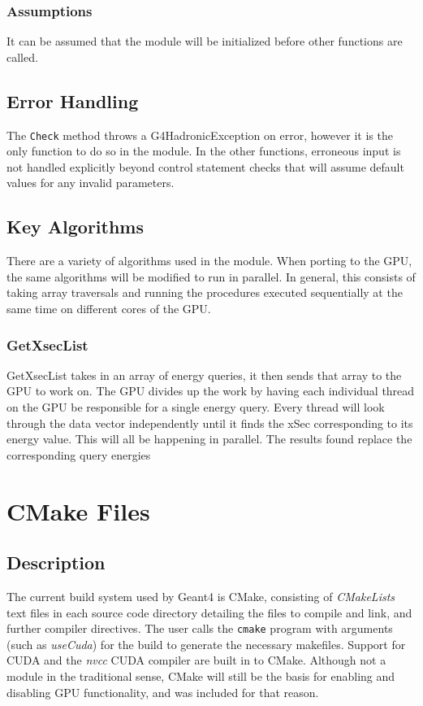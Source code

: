 \documentclass[12pt]{article}
\begin{document}
\subsubsection{Assumptions}%
It can be assumed that the module will be initialized before other functions are called.

\subsection{Error Handling}
The \texttt{Check} method throws a G4HadronicException on error, however it is the only function to do so in the module. In the other functions, erroneous input is not handled explicitly beyond control statement checks that will assume default values for any invalid parameters.

\subsection{Key Algorithms}
There are a variety of algorithms used in the module. When porting to the GPU, the same algorithms will be modified to run in parallel. In general, this consists of taking array traversals and running the procedures executed sequentially at the same time on different cores of the GPU. 

\subsubsection{GetXsecList}
GetXsecList takes in an array of energy queries, it then sends that array to the GPU to work on. The GPU divides up the work by having each individual thread on the GPU be responsible for a single energy query. Every thread will look through the data vector independently until it finds the xSec corresponding to its energy value. This will all be happening in parallel. The results found replace the corresponding query energies  



\section{CMake Files}
\subsection{Description}\label{Sec_CMakeDesc}
The current build system used by Geant4 is CMake, consisting of \emph{CMakeLists} text files in each source code directory detailing the files to compile and link, and further compiler directives. The user calls the \texttt{cmake} program with arguments (such as \emph{useCuda}) for the build to generate the necessary makefiles. Support for CUDA and the \emph{nvcc} CUDA compiler are built in to CMake. Although not a module in the traditional sense, CMake will still be the basis for enabling and disabling GPU functionality, and was included for that reason.
\end{document}
